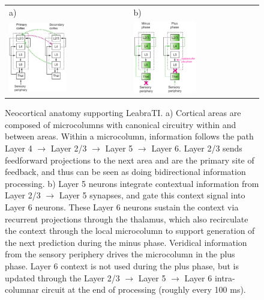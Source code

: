 \documentclass[10pt,letterpaper]{article}
\numberwithin{equation}{section}
\begin{document}
\begin{figure}[h]
\centering
\begin{tabular}{ll}
a) & b) \\                
\includegraphics[width=0.49\textwidth]{figs/microcircuit_horiz} & 
\includegraphics[width=0.51\textwidth]{figs/microcircuit_minus_plus} \\
\end{tabular}
\caption{\small{Neocortical anatomy supporting LeabraTI. a) Cortical areas are composed of microcolumns with canonical circuitry within and between areas. Within a microcolumn, information follows the path Layer 4 $\rightarrow$ Layer 2/3 $\rightarrow$ Layer 5 $\rightarrow$ Layer 6. Layer 2/3 sends feedforward projections to the next area and are the primary site of feedback, and thus can be seen as doing bidirectional information processing. b) Layer 5 neurons integrate contextual information from Layer 2/3 $\rightarrow$ Layer 5 synapses, and gate this context signal into Layer 6 neurons. These Layer 6 neurons sustain the context via recurrent projections through the thalamus, which also recirculate the context through the local microcolumn to support generation of the next prediction during the minus phase. Veridical information from the sensory periphery drives the microcolumn in the plus phase. Layer 6 context is not used during the plus phase, but is updated through the Layer 2/3 $\rightarrow$ Layer 5 $\rightarrow$ Layer 6 intra-columnar circuit at the end of processing (roughly every 100 ms).}}
\label{fig:leabrati}
\end{figure}
\end{document}
